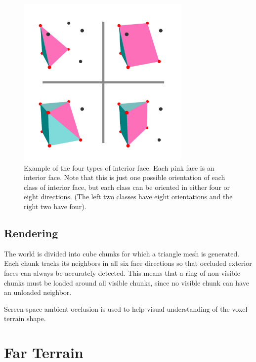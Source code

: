 \begin{figure}
	\centering
		\includegraphics[width=0.75\textwidth]{figures/interiorfaces2.png}
	\caption{
		Example of the four types of interior face.
		Each pink face is an interior face.
		Note that this is just one possible orientation of each class of interior face, but each class can be oriented in either four or eight directions.
		(The left two classes have eight orientations and the right two have four).
	}
	\label{fig:interiorfaces2}
\end{figure}

\subsection{Rendering}

The world is divided into cube chunks for which a triangle mesh is generated.
Each chunk tracks its neighbors in all six face directions so that occluded exterior faces can always be accurately detected.
This means that a ring of non-visible chunks must be loaded around all visible chunks, since no visible chunk can have an unloaded neighbor.

Screen-space ambient occlusion is used to help visual understanding of the voxel terrain shape.


\section{Far Terrain} \label{clipterrain} %

